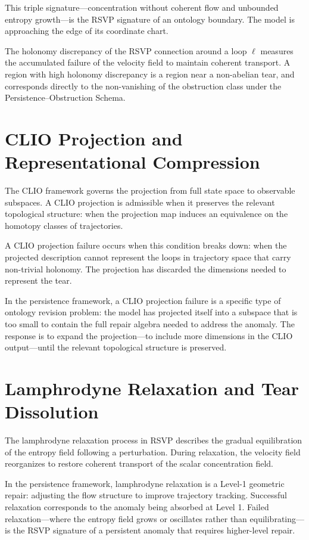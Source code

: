 \documentclass[12pt,oneside]{book}
\theoremstyle{plain}
\theoremstyle{definition}
\theoremstyle{remark}
\newcommand{\1}{\mathbf{1}}
\begin{document}
This triple signature---concentration without coherent flow and unbounded entropy growth---is the RSVP signature of an ontology boundary. The model is approaching the edge of its coordinate chart.

The holonomy discrepancy of the RSVP connection around a loop $\ell$ measures the accumulated failure of the velocity field to maintain coherent transport. A region with high holonomy discrepancy is a region near a non-abelian tear, and corresponds directly to the non-vanishing of the obstruction class under the Persistence--Obstruction Schema.

\section{CLIO Projection and Representational Compression}

The CLIO framework governs the projection from full state space to observable subspaces. A CLIO projection is admissible when it preserves the relevant topological structure: when the projection map induces an equivalence on the homotopy classes of trajectories.

A CLIO projection failure occurs when this condition breaks down: when the projected description cannot represent the loops in trajectory space that carry non-trivial holonomy. The projection has discarded the dimensions needed to represent the tear.

In the persistence framework, a CLIO projection failure is a specific type of ontology revision problem: the model has projected itself into a subspace that is too small to contain the full repair algebra needed to address the anomaly. The response is to expand the projection---to include more dimensions in the CLIO output---until the relevant topological structure is preserved.

\section{Lamphrodyne Relaxation and Tear Dissolution}

The lamphrodyne relaxation process in RSVP describes the gradual equilibration of the entropy field following a perturbation. During relaxation, the velocity field reorganizes to restore coherent transport of the scalar concentration field.

In the persistence framework, lamphrodyne relaxation is a Level-1 geometric repair: adjusting the flow structure to improve trajectory tracking. Successful relaxation corresponds to the anomaly being absorbed at Level 1. Failed relaxation---where the entropy field grows or oscillates rather than equilibrating---is the RSVP signature of a persistent anomaly that requires higher-level repair.
\end{document}
